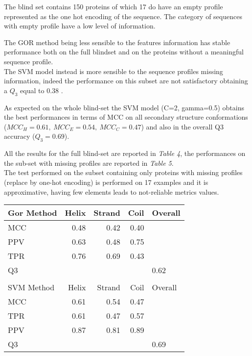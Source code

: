 \documentclass[a4paper,twocolumn]{article}
\begin{document}
The blind set contains 150 proteins of which 17 do have an empty profile
represented as the one hot encoding of the sequence. The category of sequences with empty
profile have a low level of information.

The GOR method being less sensible to the features information has stable
performance both on the full blindset and on the proteins without a meaningful
sequence profile.\\
The SVM model instead is more sensible to the sequence profiles missing information, indeed the performance on this subset are not satisfactory obtaining a \(Q_{3}\) equal to \(0.38\) .

As expected on the whole blind-set the SVM model (C=2, gamma=0.5) obtains the
best performances in terms of MCC on all secondary structure conformations (\(MCC_{H} = 0.61 , \: MCC_{E}=0.54 , \: MCC_{C}=0.47\)) and
also in the overall Q3 accuracy (\(Q_{3} = 0.69\)).


All the results for the full blind-set are reported in \emph{Table 4}, the performances on the
sub-set with missing profiles are reported in \emph{Table 5}.\\
The test performed on the subset containing only proteins with missing profiles (replace by one-hot encoding) is performed on 17 examples and it is approximative, having few elements leads to not-reliable metrics values.\\

\begin{center}
\begin{tabular}{lrrrl}
Gor Method & Helix & Strand & Coil & Overall\\
\hline
MCC & 0.48 & 0.42 & 0.40 & \\
PPV & 0.63 & 0.48 & 0.75 & \\
TPR & 0.76 & 0.69 & 0.43 & \\
Q3 &  &  &  & 0.62\\
 &  &  &  & \\
SVM Method & Helix & Strand & Coil & Overall\\
\hline
MCC & 0.61 & 0.54 & 0.47 & \\
TPR & 0.61 & 0.47 & 0.57 & \\
PPV & 0.87 & 0.81 & 0.89 & \\
Q3 &  &  &  & 0.69\\
\end{tabular}
\end{center}
\end{document}
